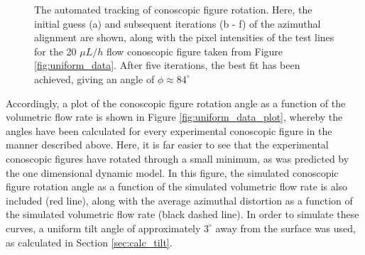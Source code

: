 \begin{figure}
\begin{center}
\hspace{0.3in}
\hspace{0.3in}
\hspace{0.3in}
\end{center}
\caption[Automated tracking of the conoscopic figure rotation]{\label{fig:uniform_rotation}The automated tracking of conoscopic figure rotation. Here, the initial guess (a) and subsequent iterations (b - f) of the azimuthal alignment are shown, along with the pixel intensities of the test lines for the 20 $\mu L/h$ flow conoscopic figure taken from Figure \ref{fig:uniform_data}. After five iterations, the best fit has been achieved, giving an angle of $\phi\approx84^{\circ}$}
\end{figure}

Accordingly, a plot of the conoscopic figure rotation angle as a function of the volumetric flow rate is shown in Figure \ref{fig:uniform_data_plot}, whereby the angles have been calculated for every experimental conoscopic figure in the manner described above. Here, it is far easier to see that the experimental conoscopic figures have rotated through a small minimum, as was predicted by the one dimensional dynamic model. In this figure, the simulated conoscopic figure rotation angle as a function of the simulated volumetric flow rate is also included (red line), along with the average azimuthal distortion as a function of the simulated volumetric flow rate (black dashed line). In order to simulate these curves, a uniform tilt angle of approximately $3^{\circ}$ away from the surface was used, as calculated in Section \ref{sec:calc_tilt}.

